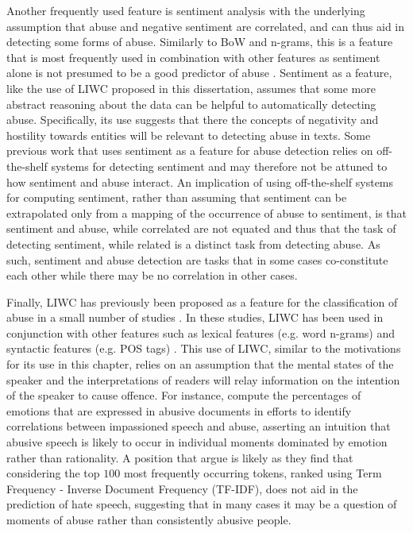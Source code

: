 Another frequently used feature is sentiment analysis \citep{Fortuna:2018} with the underlying assumption that abuse and negative sentiment are correlated, and can thus aid in detecting some forms of abuse. Similarly to BoW and n-grams, this is a feature that is most frequently used in combination with other features as sentiment alone is not presumed to be a good predictor of abuse \citep{Fortuna:2018}. Sentiment as a feature, like the use of LIWC proposed in this dissertation, assumes that some more abstract reasoning about the data can be helpful to automatically detecting abuse. Specifically, its use suggests that there the concepts of negativity and hostility towards entities will be relevant to detecting abuse in texts. Some previous work that uses sentiment as a feature for abuse detection \citep{Davidson:2017} relies on off-the-shelf systems for detecting sentiment and may therefore not be attuned to how sentiment and abuse interact. An implication of using off-the-shelf systems for computing sentiment, rather than assuming that sentiment can be extrapolated only from a mapping of the occurrence of abuse to sentiment, is that sentiment and abuse, while correlated are not equated and thus that the task of detecting sentiment, while related is a distinct task from detecting abuse. As such, sentiment and abuse detection are tasks that in some cases co-constitute each other while there may be no correlation in other cases.

Finally, LIWC has previously been proposed as a feature for the classification of abuse in a small number of studies \citep{Nina-Alcocer:2019,Joksimovic:2019}. In these studies, LIWC has been used in conjunction with other features such as lexical features (e.g. word n-grams) and syntactic features (e.g. POS tags) \citep{Joksimovic:2019}. This use of LIWC, similar to the motivations for its use in this chapter, relies on an assumption that the mental states of the speaker and the interpretations of readers will relay information on the intention of the speaker to cause offence. For instance, \citet{Nina-Alcocer:2019} compute the percentages of emotions that are expressed in abusive documents in efforts to identify correlations between impassioned speech and abuse, asserting an intuition that abusive speech is likely to occur in individual moments dominated by emotion rather than rationality. A position that \citep{Waseem:2016} argue is likely as they find that considering the top $100$ most frequently occurring tokens, ranked using Term Frequency - Inverse Document Frequency (TF-IDF), does not aid in the prediction of hate speech, suggesting that in many cases it may be a question of moments of abuse rather than consistently abusive people.

